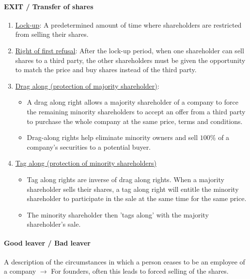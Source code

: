 \paragraph{EXIT / Transfer of shares}


\begin{enumerate}[]
    \item \underline{Lock-up}: A predetermined amount of time where shareholders
        are restricted from selling their shares.
    \item \underline{Right of first refusal}: After the lock-up period, when
        one shareholder can sell shares to a third party, the other shareholders
        must be given the opportunity to match the price and buy shares instead
        of the third party.
    \item \underline{Drag along (protection of majority shareholder)}:
        \begin{itemize}
            \item A drag along right allows a majority shareholder of a company
                to force the remaining minority shareholders to accept an offer
                from a third party to purchase the whole company at the same price,
                terms and conditions.
            \item Drag-along rights help eliminate minority owners and sell $100 \%$
                of a company's securities to a potential buyer.
        \end{itemize}
    \item \underline{Tag along (protection of minority shareholders)}
        \begin{itemize}
            \item Tag along rights are inverse of drag along rights. When a majority
                shareholder sells their shares, a tag along right will entitle the
                minority shareholder to participate in the sale at the same time for
                the same price.
            \item The minority shareholder then 'tags along' with the majority
                shareholder's sale.
        \end{itemize}
\end{enumerate}

\paragraph{Good leaver / Bad leaver}

A description of the circumstances in which a person ceases to be an employee
of a company $\rightarrow$ For founders, often this leads to forced selling of
the shares.

